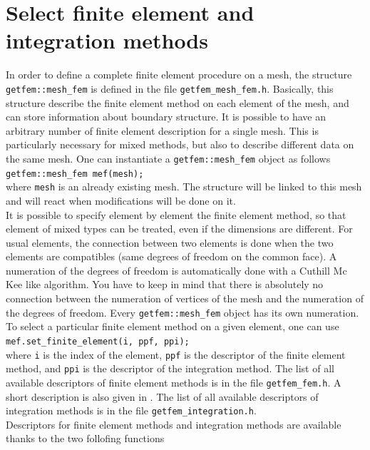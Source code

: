 \documentclass[11pt,a4paper]{article}
\begin{document}
\section{Select finite element and integration methods}

In order to define a complete finite element procedure on a mesh, the structure {\tt getfem::mesh\_fem} is defined in the file {\tt getfem\_mesh\_fem.h}. Basically, this structure describe the finite element method on each element of the mesh, and can store information about boundary structure. It is possible to have an arbitrary number of finite element description for a single mesh. This is particularly necessary for mixed methods, but also to describe different data on the same mesh. One can instantiate a {\tt getfem::mesh\_fem} object as follows\\[0.5cm]
{\tt getfem::mesh\_fem mef(mesh); }\\[0.5cm]
where {\tt mesh} is an already existing mesh. The structure will be linked to this mesh and will react when modifications will be done on it. \\[0.5cm]
It is possible to specify element by element the finite element method, so that element of mixed types can be treated, even if the dimensions are different. For usual elements, the connection between two elements is done when the two elements are compatibles (same degrees of freedom on the common face). A numeration of the degrees of freedom is automatically done with a Cuthill Mc Kee like algorithm. You have to keep in mind that there is absolutely no connection between the numeration of vertices of the mesh and the numeration of the degrees of freedom. Every {\tt getfem::mesh\_fem} object has its own numeration. \\[0.5cm]
To select a particular finite element method on a given element, one can use \\[0.5cm]
{\tt mef.set\_finite\_element(i, ppf, ppi); }\\[0.5cm]
where {\tt i} is the index of the element, {\tt ppf} is the descriptor of the finite element method, and {\tt ppi} is the descriptor of the integration method. The list of all available descriptors of finite element methods is in the file {\tt getfem\_fem.h}. A short description is also given in \cite{BASCOMP}. The list of all available descriptors of integration methods is in the file {\tt getfem\_integration.h}. \\[0.5cm]
Descriptors for finite element methods and integration methods are available thanks to the two follofing functions\\[0.5cm]
\end{document}
